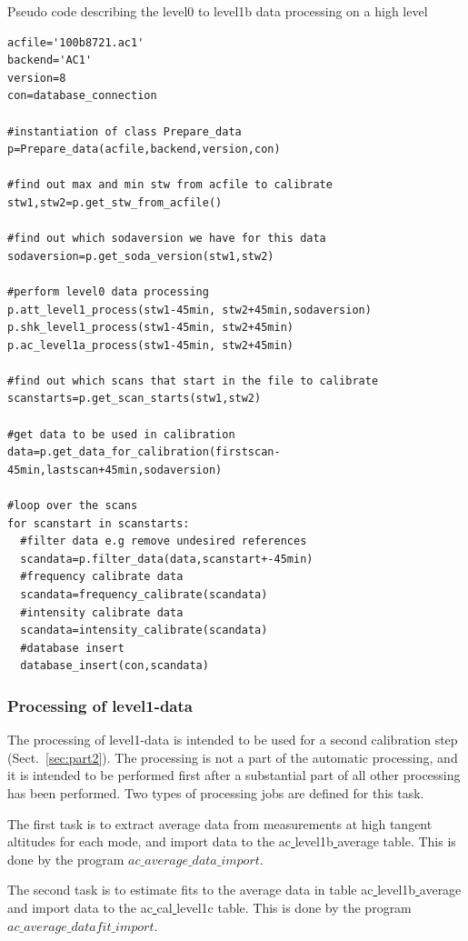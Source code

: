 \documentclass[12pt]{article}
\begin{document}
\clearpage
\newpage 
Pseudo code describing the level0 to level1b data processing on a high level
\begin{verbatim}
acfile='100b8721.ac1'
backend='AC1'
version=8
con=database_connection

#instantiation of class Prepare_data 
p=Prepare_data(acfile,backend,version,con)

#find out max and min stw from acfile to calibrate
stw1,stw2=p.get_stw_from_acfile()

#find out which sodaversion we have for this data
sodaversion=p.get_soda_version(stw1,stw2)

#perform level0 data processing
p.att_level1_process(stw1-45min, stw2+45min,sodaversion)
p.shk_level1_process(stw1-45min, stw2+45min)
p.ac_level1a_process(stw1-45min, stw2+45min)

#find out which scans that start in the file to calibrate
scanstarts=p.get_scan_starts(stw1,stw2)

#get data to be used in calibration
data=p.get_data_for_calibration(firstscan-45min,lastscan+45min,sodaversion)

#loop over the scans
for scanstart in scanstarts:
  #filter data e.g remove undesired references
  scandata=p.filter_data(data,scanstart+-45min)
  #frequency calibrate data
  scandata=frequency_calibrate(scandata)
  #intensity calibrate data  
  scandata=intensity_calibrate(scandata)
  #database insert
  database_insert(con,scandata)

\end{verbatim}



\subsubsection{Processing of level1-data}
\label{sec:level1processing}

The processing of level1-data is intended to be used for a second
calibration step (Sect.~\ref{sec:part2}). The processing is not a part of 
the automatic processing, and it is intended to be performed first
after a substantial part of all other processing has been performed.
Two types of processing jobs are defined for this task.

The first task is to extract average data from measurements
at high tangent altitudes for each mode, and import data to the
ac\underline{ }level1b\underline{ }average table.
This is done by the program \(ac\_average\_data\_import\).

The second task is to estimate fits to the average data
in table ac\underline{ }level1b\underline{ }average
and import data to the ac\underline{ }cal\underline{ }level1c table.
This is done by the program \(ac\_average\_datafit\_import\).
\end{document}

